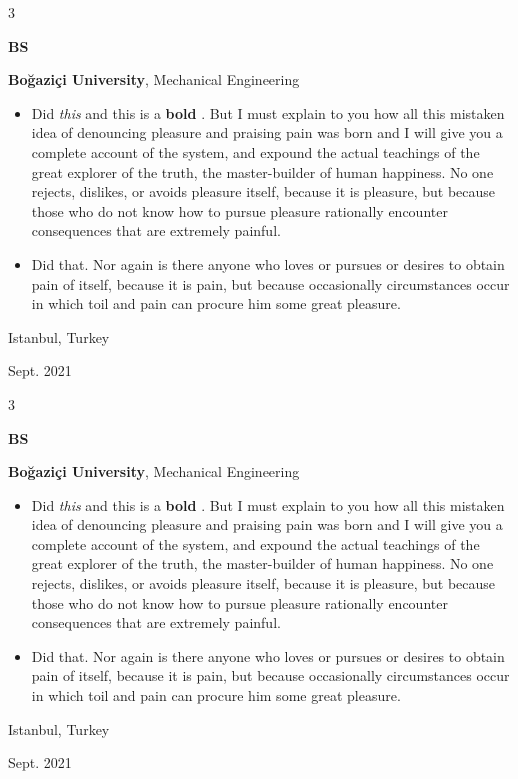 \documentclass[10pt, letterpaper]{article}
\newenvironment{highlights}{
    \begin{itemize}[
        topsep=0.10 cm,
        parsep=0.10 cm,
        partopsep=0pt,
        itemsep=0pt,
        leftmargin=0.4 cm + 10pt
    ]
}{
    \end{itemize}
} %
\newenvironment{threecolentry}[3][]{
    \onecolentry
    \def\thirdColumn{#3}
    \setcolumnwidth{1 cm, \fill, 4.5 cm}
    \begin{paracol}{3}
    {\raggedright #2} \switchcolumn
}{
    \switchcolumn \raggedleft \thirdColumn
    \end{paracol}
    \endonecolentry
} %
\let\hrefWithoutArrow\href
\renewcommand{\href}[2]{\hrefWithoutArrow{#1}{\mbox{\ifthenelse{\equal{#2}{}}{ }{#2 }\raisebox{.15ex}{\footnotesize \faExternalLink*}}}}
\begin{document}
        \vspace{0.2 cm}

        \begin{threecolentry}{\textbf{BS}}{
            Istanbul, Turkey

        Sept. 2021
        }
            \textbf{Boğaziçi University}, Mechanical Engineering
            \begin{highlights}
                \item Did \textit{this} and this is a \textbf{bold} \href{https://example.com}{link}. But I must explain to you how all this mistaken idea of denouncing pleasure and praising pain was born and I will give you a complete account of the system, and expound the actual teachings of the great explorer of the truth, the master-builder of human happiness. No one rejects, dislikes, or avoids pleasure itself, because it is pleasure, but because those who do not know how to pursue pleasure rationally encounter consequences that are extremely painful.
                \item Did that. Nor again is there anyone who loves or pursues or desires to obtain pain of itself, because it is pain, but because occasionally circumstances occur in which toil and pain can procure him some great pleasure.
            \end{highlights}
        \end{threecolentry}

        \vspace{0.2 cm}

        \begin{threecolentry}{\textbf{BS}}{
            Istanbul, Turkey

        Sept. 2021
        }
            \textbf{Boğaziçi University}, Mechanical Engineering
            \begin{highlights}
                \item Did \textit{this} and this is a \textbf{bold} \href{https://example.com}{link}. But I must explain to you how all this mistaken idea of denouncing pleasure and praising pain was born and I will give you a complete account of the system, and expound the actual teachings of the great explorer of the truth, the master-builder of human happiness. No one rejects, dislikes, or avoids pleasure itself, because it is pleasure, but because those who do not know how to pursue pleasure rationally encounter consequences that are extremely painful.
                \item Did that. Nor again is there anyone who loves or pursues or desires to obtain pain of itself, because it is pain, but because occasionally circumstances occur in which toil and pain can procure him some great pleasure.
            \end{highlights}
        \end{threecolentry}
\end{document}
